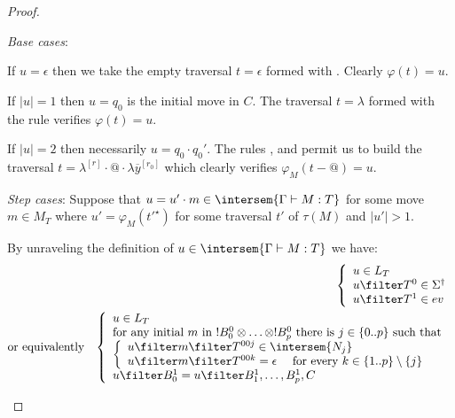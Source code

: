 \begin{proof}
\begin{enumerate}[$\bullet$]
\begin{enumerate}
    \emph{Base cases}:
    \begin{compactitem}[-]
    \item If $u=\epsilon$ then we take the empty traversal $t=\epsilon$ formed
with . Clearly $\varphi(t) = u$.
    \item If $|u|=1$ then $u=q_0$ is the initial move in $C$. The traversal $t=\lambda$ formed with the rule  verifies $\varphi(t) = u$.
    \item If $|u|=2$ then necessarily $u = q_0 \cdot q_0'$. The rules , 
and  permit us to build the traversal $t = \lambda^{[r]} \cdot @ \cdot \lambda \overline{y}^{[r_0]}$ which clearly verifies $\varphi_M(t-@) = u$.
    \end{compactitem}

    \emph{Step cases}: Suppose that $u = u' \cdot m \in
    \intersem{\Gamma \vdash M : T}$ for some move $m \in
    M_T$ where $u' = \varphi_M(t'^\star)$ for some traversal
    $t'$ of $\tau(M)$ and $|u'|>1$.

    By unraveling the definition of $u \in \intersem{\Gamma \vdash M : T}$ we have:
    \begin{eqnarray*}
      &&      \left\{
            \begin{array}{ll}
                u \in L_T\\
                u \filter T^0  \in \Sigma^\dagger \\
                u \filter T^1  \in  ev
            \end{array}
            \right. \\
    & \mbox{or equivalently} & \left\{
    \begin{array}{ll}
        u \in L_T \\
        \hbox{for any initial $m$ in $!B_0^0 \otimes \ldots \otimes !B_p^0$ there is $j \in \{0..p\}$ such that } \\
        \left\{\begin{array}{ll}
            u \filter m \filter T^{00j} \in \intersem{N_j} \label{eq:def_z} \\
            u \filter m \filter T^{00k} = \epsilon \quad \mbox{ for every } k\in \{1..p\}\setminus\{j\} \label{eq:b}
        \end{array}
        \right. \\
        u \filter B^1_0 = u \filter B^1_1, \ldots, B^1_p, C
    \end{array}
    \right.
    \end{eqnarray*}


\end{enumerate}
\end{enumerate}
\end{proof}
